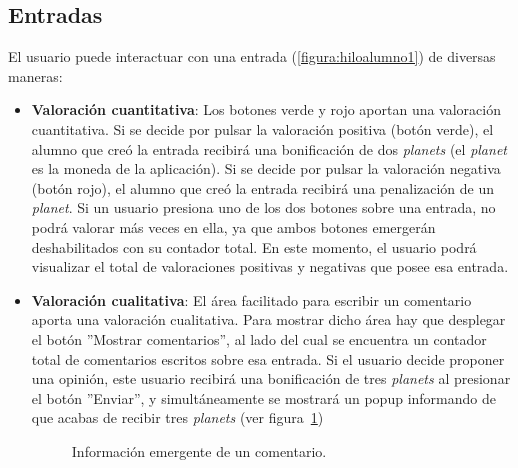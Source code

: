 \documentclass[a4paper, 12pt]{book}
\begin{document}
\subsection{Entradas}
El usuario puede interactuar con una entrada (\ref{figura:hiloalumno1}) de diversas maneras:
\begin{itemize}
  \item {\bfseries Valoraci\'on cuantitativa}: Los botones verde y rojo aportan una valoraci\'on cuantitativa. Si se decide por pulsar 
  la valoraci\'on positiva (bot\'on verde), el alumno que cre\'o la entrada recibir\'a una bonificaci\'on de dos \textit{planets} (el \textit{planet} es la 
  moneda de la aplicaci\'on). Si se decide por pulsar la valoraci\'on negativa (bot\'on rojo), el alumno que cre\'o la entrada recibir\'a una penalizaci\'on 
  de un \textit{planet}. Si un usuario presiona uno de los dos botones sobre una entrada, no podr\'a valorar m\'as veces en ella, ya que ambos botones 
  emerger\'an deshabilitados con su contador total. En este momento, el usuario podr\'a visualizar el total de valoraciones positivas y negativas que posee 
  esa entrada.
  \item {\bfseries Valoraci\'on cualitativa}: El \'area facilitado para escribir un comentario aporta una valoraci\'on cualitativa. Para mostrar dicho 
  \'area hay que desplegar el bot\'on ''Mostrar comentarios'', al lado del cual se encuentra un contador total de comentarios escritos sobre esa entrada.
  Si el usuario decide proponer una opini\'on, este usuario recibir\'a una bonificaci\'on de tres \textit{planets} al presionar el bot\'on ''Enviar'', y 
  simult\'aneamente se mostrar\'a un popup informando de que acabas de recibir tres \textit{planets} (ver figura~\ref{figura:hiloalumno6})
  \begin{figure}[htbp] 
    \centering
    \caption{Informaci\'on emergente de un comentario.}
    \label{figura:hiloalumno6}
  \end{figure}
  

\end{itemize}
\end{document}
